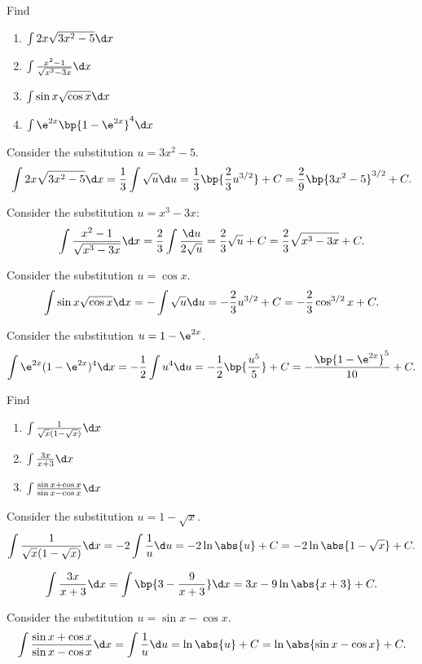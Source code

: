 \begin{problem}
    Find
    \begin{enumerate}
        \item $\int 2x\sqrt{3x^2 - 5} \d x$
        \item $\int \frac{x^2 - 1}{\sqrt{x^3 - 3x}} \d x$
        \item $\int \sin x \sqrt{\cos x} \d x$
        \item $\int \e^{2x} \bp{1 - \e^{2x}}^4 \d x$
    \end{enumerate}
\end{problem}
\begin{solution}
    \begin{ppart}
        Consider the substitution $u = 3x^2 - 5$. \[\int 2x\sqrt{3x^2 - 5} \d x = \frac13 \int \sqrt{u} \d u = \frac13 \bp{\frac23 u^{3/2}} + C = \frac29 \bp{3x^2 - 5}^{3/2} + C.\]
    \end{ppart}
    \begin{ppart}
        Consider the substitution $u = x^3 - 3x$: \[\int \frac{x^2 - 1}{\sqrt{x^3 - 3x}} \d x = \frac23 \int \frac{\d u}{2\sqrt{u}} = \frac23 \sqrt{u} + C = \frac23 \sqrt{x^3 - 3x} + C.\]
    \end{ppart}
    \begin{ppart}
        Consider the substitution $u = \cos x$. \[\int \sin x \sqrt{\cos x} \d x = - \int \sqrt{u} \d u = -\frac23 u^{3/2} + C = -\frac23 \cos^{3/2} x + C.\]
    \end{ppart}
    \begin{ppart}
        Consider the substitution $u = 1 - \e^{2x}$. \[\int \e^{2x}(1 - \e^{2x})^4 \d x = -\frac12 \int u^4 \d u = -\frac12 \bp{\frac{u^5}{5}} + C = -\frac{\bp{1 - \e^{2x}}^5}{10} + C.\]
    \end{ppart}
\end{solution}

\begin{problem}
    Find
    \begin{enumerate}
        \item $\int \frac1{\sqrt{x}(1- \sqrt{x})} \d x$
        \item $\int \frac{3x}{x+3} \d x$
        \item $\int \frac{\sin x + \cos x}{\sin x - \cos x} \d x$
    \end{enumerate}
\end{problem}
\begin{solution}
    \begin{ppart}
        Consider the substitution $u = 1 - \sqrt x$. \[\int \frac1{\sqrt{x}(1- \sqrt{x})} \d x = -2 \int \frac1{u} \d u = -2 \ln \abs{u} + C = -2 \ln \abs{1 - \sqrt{x}} + C.\]
    \end{ppart}
    \begin{ppart}
        \[\int \frac{3x}{x+3} \d x = \int \bp{3 - \frac9{x+3} }\d x = 3x - 9\ln\abs{x+3} + C.\]
    \end{ppart}
    \begin{ppart}
        Consider the substitution $u = \sin x - \cos x$. \[\int \frac{\sin x + \cos x}{\sin x - \cos x}\d x = \int \frac1{u} \d u = \ln \abs{u} + C = \ln \abs{\sin x - \cos x} + C.\]
    \end{ppart}
\end{solution}

